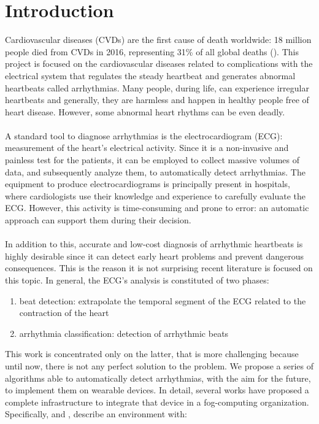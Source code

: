 \documentclass[LaM,binding=0.6cm]{sapthesis}
\begin{document}
\chapter{Introduction}
Cardiovascular diseases (CVDs) are the first cause of death worldwide: 18 million people died from CVDs in 2016, representing 31\% of all global deaths (\cite{who}). This project is focused on the cardiovascular diseases related to complications with the electrical system that regulates the steady heartbeat and generates abnormal heartbeats called arrhythmias. Many people, during life, can experience irregular heartbeats and generally, they are harmless and happen in healthy people free of heart disease. However, some abnormal heart rhythms can be even deadly.\\\\A standard tool to diagnose arrhythmias is the electrocardiogram (ECG): measurement of the heart's electrical activity. Since it is a non-invasive and painless test for the patients, it can be employed to collect massive volumes of data, and subsequently analyze them, to automatically detect arrhythmias. The equipment to produce electrocardiograms is principally present in hospitals, where cardiologists use their knowledge and experience to carefully evaluate the ECG. However, this activity is time-consuming and prone to error: an automatic approach can support them during their decision.\\\\In addition to this, accurate and low-cost diagnosis of arrhythmic heartbeats is highly desirable since it can detect early heart problems and prevent dangerous consequences. This is the reason it is not surprising recent literature is focused on this topic. In general, the ECG's analysis is constituted of two phases:
\begin{enumerate}
\item beat detection: extrapolate the temporal segment of the ECG related to the contraction of the heart
\item arrhythmia  classification: detection of arrhythmic beats
\end{enumerate} 
This work is concentrated only on the latter, that is more challenging because until now, there is not any perfect solution to the problem. We propose a series of algorithms able to automatically detect arrhythmias, with the aim for the future, to implement them on wearable devices. In detail, several works have proposed a complete infrastructure to integrate that device in a fog-computing organization. Specifically, \cite{fog} and \cite{citf}, describe an environment with:
\end{document}
